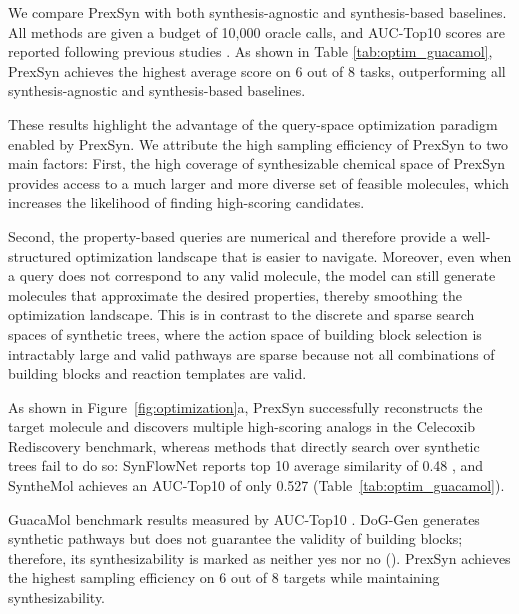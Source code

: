 We compare PrexSyn with both synthesis-agnostic and synthesis-based baselines.
All methods are given a budget of 10,000 oracle calls, and AUC-Top10 scores are reported following previous studies \citep{gao2022sample}.
As shown in Table \ref{tab:optim_guacamol}, PrexSyn achieves the highest average score on 6 out of 8 tasks, outperforming all synthesis-agnostic and synthesis-based baselines.

These results highlight the advantage of the query-space optimization paradigm enabled by PrexSyn.
We attribute the high sampling efficiency of PrexSyn to two main factors:
First, the high coverage of synthesizable chemical space of PrexSyn provides access to a much larger and more diverse set of feasible molecules, which increases the likelihood of finding high-scoring candidates.


Second, the property-based queries are numerical and therefore provide a well-structured optimization landscape that is easier to navigate.
Moreover, even when a query does not correspond to any valid molecule, the model can still generate molecules that approximate the desired properties, thereby smoothing the optimization landscape.
This is in contrast to the discrete and sparse search spaces of synthetic trees, where the action space of building block selection is intractably large and valid pathways are sparse because not all combinations of building blocks and reaction templates are valid.

As shown in Figure~\ref{fig:optimization}a, PrexSyn successfully reconstructs the target molecule and discovers multiple high-scoring analogs in the Celecoxib Rediscovery benchmark, whereas methods that directly search over synthetic trees fail to do so: SynFlowNet reports top 10 average similarity of 0.48 \citep{cretu2024synflownet}, and SyntheMol achieves an AUC-Top10 of only 0.527 (Table~\ref{tab:optim_guacamol}).




\begin{table}[tb]
  \small
  \caption{
    GuacaMol benchmark results measured by AUC-Top10 \citep{gao2022sample}.
    DoG-Gen \citep{bradshaw2020barking} generates synthetic pathways but does not guarantee the validity of building blocks; therefore, its synthesizability is marked as neither yes nor no ().
    PrexSyn achieves the highest sampling efficiency on 6 out of 8 targets while maintaining synthesizability.
  }
  \label{tab:optim_guacamol}
  \centering
  \begin{adjustbox}{max width=1\textwidth}
  
  \end{adjustbox}
\end{table}



